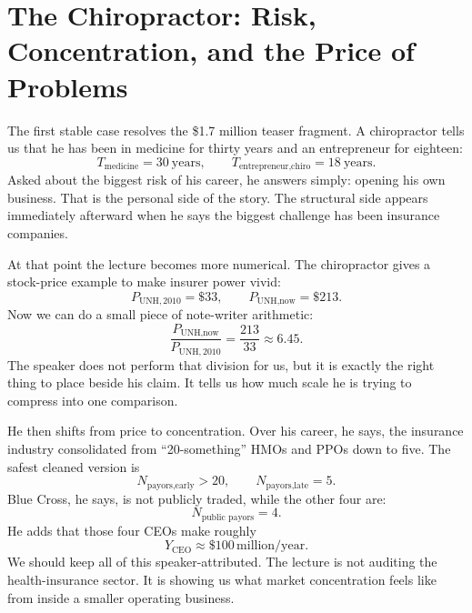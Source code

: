 \section{The Chiropractor: Risk, Concentration, and the Price of Problems}

The first stable case resolves the \$1.7 million teaser fragment. A chiropractor tells us that he has been in medicine for thirty years and an entrepreneur for eighteen:
\begin{equation}
T_{\text{medicine}} = 30\ \text{years},\qquad
T_{\text{entrepreneur,chiro}} = 18\ \text{years}.
\end{equation}
Asked about the biggest risk of his career, he answers simply: opening his own business. That is the personal side of the story. The structural side appears immediately afterward when he says the biggest challenge has been insurance companies.

At that point the lecture becomes more numerical. The chiropractor gives a stock-price example to make insurer power vivid:
\begin{equation}
P_{\text{UNH},2010} = \$33,\qquad
P_{\text{UNH},\text{now}} = \$213.
\end{equation}
Now we can do a small piece of note-writer arithmetic:
\begin{equation}
\frac{P_{\text{UNH},\text{now}}}{P_{\text{UNH},2010}}
= \frac{213}{33}\approx 6.45.
\end{equation}
The speaker does not perform that division for us, but it is exactly the right thing to place beside his claim. It tells us how much scale he is trying to compress into one comparison.

He then shifts from price to concentration. Over his career, he says, the insurance industry consolidated from ``20-something'' HMOs and PPOs down to five. The safest cleaned version is
\begin{equation}
N_{\text{payors,early}} > 20,\qquad
N_{\text{payors,late}} = 5.
\end{equation}
Blue Cross, he says, is not publicly traded, while the other four are:
\begin{equation}
N_{\text{public payors}} = 4.
\end{equation}
He adds that those four CEOs make roughly
\begin{equation}
Y_{\text{CEO}} \approx \$100\,\text{million/year}.
\end{equation}
We should keep all of this speaker-attributed. The lecture is not auditing the health-insurance sector. It is showing us what market concentration feels like from inside a smaller operating business.

